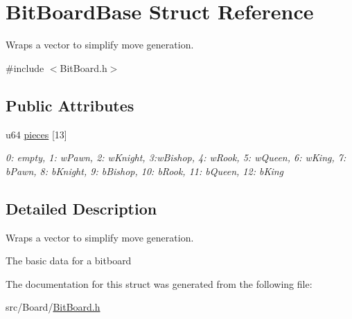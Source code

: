 \hypertarget{structBitBoardBase}{}\section{Bit\+Board\+Base Struct Reference}
\label{structBitBoardBase}


Wraps a vector to simplify move generation.  




{\ttfamily \#include $<$Bit\+Board.\+h$>$}

\subsection*{Public Attributes}
\begin{DoxyCompactItemize}
\item 
\mbox{\label{structBitBoardBase_a1fd8c1b15e2e329e89b932fb5c3c4811}} 
u64 \hyperlink{structBitBoardBase_a1fd8c1b15e2e329e89b932fb5c3c4811}{pieces} \mbox{[}13\mbox{]}
\begin{DoxyCompactList}\small\item\em 0\+: empty, 1\+: w\+Pawn, 2\+: w\+Knight, 3\+:w\+Bishop, 4\+: w\+Rook, 5\+: w\+Queen, 6\+: w\+King, 7\+: b\+Pawn, 8\+: b\+Knight, 9\+: b\+Bishop, 10\+: b\+Rook, 11\+: b\+Queen, 12\+: b\+King \end{DoxyCompactList}\end{DoxyCompactItemize}


\subsection{Detailed Description}
Wraps a vector to simplify move generation. 

The basic data for a bitboard 

The documentation for this struct was generated from the following file\+:\begin{DoxyCompactItemize}
\item 
src/\+Board/\hyperlink{BitBoard_8h}{Bit\+Board.\+h}\end{DoxyCompactItemize}
